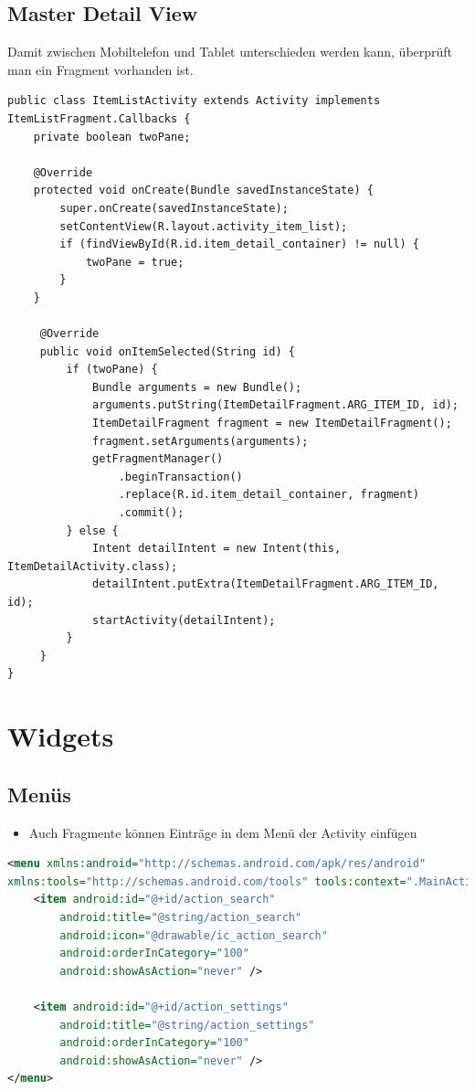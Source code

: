 \subsection{Master Detail View}
Damit zwischen Mobiltelefon und Tablet unterschieden werden kann, überprüft man ein Fragment vorhanden ist.
\begin{lstlisting}[caption=Master Detail View]
public class ItemListActivity extends Activity implements ItemListFragment.Callbacks {
	private boolean twoPane;

	@Override
	protected void onCreate(Bundle savedInstanceState) {
		super.onCreate(savedInstanceState);
		setContentView(R.layout.activity_item_list);
		if (findViewById(R.id.item_detail_container) != null) {
			twoPane = true;
		}
	}
	
	 @Override
	 public void onItemSelected(String id) {
		 if (twoPane) {
			 Bundle arguments = new Bundle();
			 arguments.putString(ItemDetailFragment.ARG_ITEM_ID, id);
			 ItemDetailFragment fragment = new ItemDetailFragment();
			 fragment.setArguments(arguments);
			 getFragmentManager()
				 .beginTransaction()
				 .replace(R.id.item_detail_container, fragment)
				 .commit();
		 } else {
			 Intent detailIntent = new Intent(this, ItemDetailActivity.class);
			 detailIntent.putExtra(ItemDetailFragment.ARG_ITEM_ID, id);
			 startActivity(detailIntent);
		 }
	 }
}
\end{lstlisting}


\section{Widgets}
\subsection{Menüs}
\begin{itemize}
	\item Auch Fragmente können Einträge in dem Menü der Activity einfügen
\end{itemize}
\begin{lstlisting}[caption=Menue in XML, language=XML]
<menu xmlns:android="http://schemas.android.com/apk/res/android"
xmlns:tools="http://schemas.android.com/tools" tools:context=".MainActivity">
	<item android:id="@+id/action_search" 
		android:title="@string/action_search"
		android:icon="@drawable/ic_action_search"
		android:orderInCategory="100"
		android:showAsAction="never" />

	<item android:id="@+id/action_settings"    
		android:title="@string/action_settings"
		android:orderInCategory="100"
		android:showAsAction="never" />
</menu>
\end{lstlisting}


